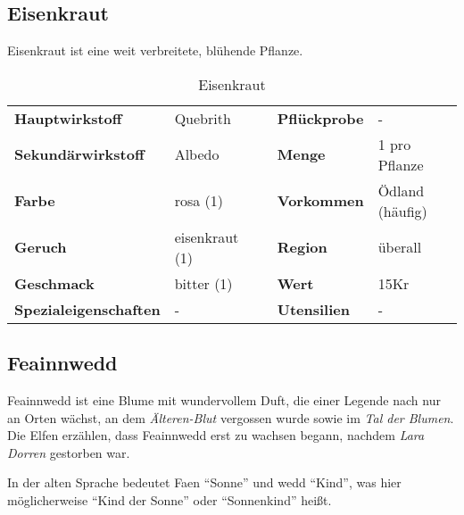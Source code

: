 

\subsection{Eisenkraut}
Eisenkraut ist eine weit verbreitete, blühende Pflanze. 

\begin{table}[h] 
\begin{center} 
\begin{tabular}{|l|l|p{1cm}|l|l|} 
  	\cline{1-2} \cline{4-5} 
  	\textbf{Hauptwirkstoff} & Quebrith && \textbf{Pflückprobe} & - \\ \cline{1-2} \cline{4-5} 
  	\textbf{Sekundärwirkstoff} & Albedo && \textbf{Menge} & 1 pro Pflanze \\ \cline{1-2} \cline{4-5} 
  	\textbf{Farbe} & rosa (1) && \textbf{Vorkommen} & Ödland (häufig) \\ \cline{1-2} \cline{4-5} 
  	\textbf{Geruch} & eisenkraut (1) && \textbf{Region} & überall \\ \cline{1-2} \cline{4-5} 
  	\textbf{Geschmack} & bitter (1) && \textbf{Wert} & 15Kr \\ \cline{1-2} \cline{4-5} 
  	\textbf{Spezialeigenschaften} & - && \textbf{Utensilien} & - \\ \cline{1-2} \cline{4-5} 
\end{tabular} 
\end{center} 
\caption{Eisenkraut} 
\label{tab:eisenkraut} 
\end{table}


\subsection{Feainnwedd}
Feainnwedd ist eine Blume mit wundervollem Duft, die einer Legende nach nur an Orten wächst, an dem \textit{Älteren-Blut} vergossen wurde sowie im \textit{Tal der Blumen}. Die Elfen erzählen, dass Feainnwedd erst zu wachsen begann, nachdem \textit{Lara Dorren} gestorben war.

In der alten Sprache bedeutet Faen "`Sonne"' und wedd "`Kind"', was hier möglicherweise "`Kind der Sonne"' oder "`Sonnenkind"' heißt. 

